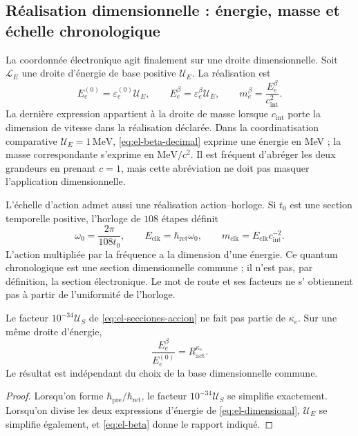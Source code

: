 \subsection{Réalisation dimensionnelle : énergie, masse et échelle chronologique}

La coordonnée électronique agit finalement sur une droite dimensionnelle.
Soit \(\mathcal L_E\) une droite d'énergie de base positive
\(\mathcal U_E\). La réalisation est
\begin{equation}
 E_e^{(0)}=\varepsilon_e^{(0)}\mathcal U_E,\qquad
 E_e^\beta=\varepsilon_e^\beta\mathcal U_E,
 \qquad m_e^\beta=\frac{E_e^\beta}{c_{\mathrm{int}}^2}.
 \label{eq:el-dimensional}
\end{equation}
La dernière expression appartient à la droite de masse lorsque
\(c_{\mathrm{int}}\) porte la dimension de vitesse dans la réalisation
déclarée. Dans la coordinatisation comparative \(\mathcal U_E=1\,\mathrm{MeV}\),
\eqref{eq:el-beta-decimal} exprime une énergie en MeV ; la masse
correspondante s'exprime en \(\mathrm{MeV}/c^2\). Il est fréquent
d'abréger les deux grandeurs en prenant \(c=1\), mais cette abréviation ne
doit pas masquer l'application dimensionnelle.

L'échelle d'action admet aussi une réalisation action--horloge. Si
\(t_0\) est une section temporelle positive, l'horloge de \(108\) étapes
définit
\begin{equation}
 \omega_0=\frac{2\pi}{108t_0},\qquad
 E_{\mathrm{clk}}=\hbar_{\mathrm{ret}}\omega_0,\qquad
 m_{\mathrm{clk}}=E_{\mathrm{clk}}c_{\mathrm{int}}^{-2}.
 \label{eq:el-cuanto-reloj}
\end{equation}
L'action multipliée par la fréquence a la dimension d'une énergie. Ce quantum
chronologique est une section dimensionnelle commune ; il n'est pas, par définition,
la section électronique. Le mot de route et ses facteurs ne s'
obtiennent pas à partir de l'uniformité de l'horloge.

\begin{proposition}
Le facteur \(10^{-34}\mathcal U_S\) de \eqref{eq:el-secciones-accion} ne fait pas partie de \(\kappa_e\). Sur une même droite d'énergie,
\begin{equation}
 \frac{E_e^\beta}{E_e^{(0)}}=R_{\mathrm{act}}^{\kappa_e}.
 \label{eq:el-razon-energia}
\end{equation}
Le résultat est indépendant du choix de la base dimensionnelle
commune.
\end{proposition}
\begin{proof}
Lorsqu'on forme \(\hbar_{\mathrm{pre}}/\hbar_{\mathrm{ret}}\), le facteur
\(10^{-34}\mathcal U_S\) se simplifie exactement. Lorsqu'on divise les deux
expressions d'énergie de \eqref{eq:el-dimensional}, \(\mathcal U_E\) se simplifie
également, et \eqref{eq:el-beta} donne le rapport indiqué.
\end{proof}

